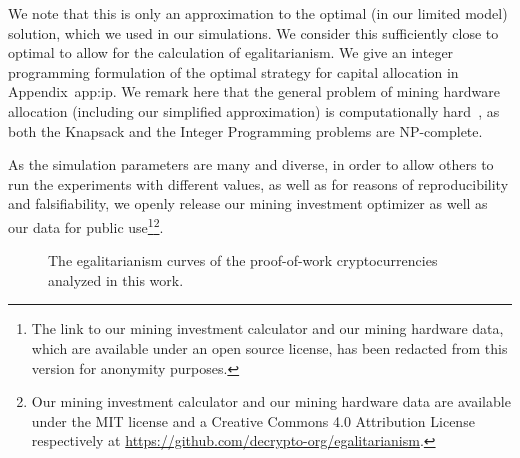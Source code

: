 We note that this is only an approximation to the optimal (in our limited model)
solution, which we used in our simulations. We consider this sufficiently close
to optimal to allow for the calculation of egalitarianism. We give an integer
programming formulation of the optimal strategy for capital allocation in
Appendix~{app:ip}. We remark here that the general problem of mining hardware
allocation (including our simplified approximation) is computationally
hard~\cite{karp1972reducibility}, as both the Knapsack and the Integer
Programming problems are NP-complete.

As the simulation parameters are many and diverse, in order to allow others to
run the experiments with different values, as well as for reasons of
reproducibility and falsifiability, we openly release our mining investment
optimizer as well as our data for public use\ifanonymous\footnote{The link to our mining investment calculator and our mining hardware data,
  which are available under an open source license, has been redacted from this
  version for anonymity purposes.
}\else\footnote{Our mining investment calculator and our mining hardware data are available
  under the MIT license and a Creative Commons 4.0 Attribution License
  respectively at \url{https://github.com/decrypto-org/egalitarianism}.
}\fi.

\begin{figure}
  \caption{The egalitarianism curves of the proof-of-work cryptocurrencies analyzed in this work.}
  \label{fig:egalitarian_curves_pow}
\end{figure}

